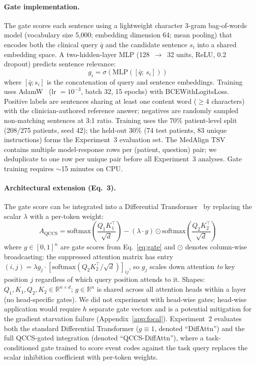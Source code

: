 \documentclass{article}
\begin{document}
\paragraph{Gate implementation.} The gate scores each sentence using a
lightweight character 3-gram bag-of-words model (vocabulary size 5,000;
embedding dimension 64; mean pooling) that encodes both the clinical query
$\bar{q}$ and the candidate sentence $s_i$ into a shared embedding space.
A two-hidden-layer MLP (128~$\to$~32 units, ReLU, 0.2 dropout) predicts
sentence relevance:
\begin{equation}
  g_i = \sigma\!\left(\mathrm{MLP}\!\left([\bar{q};\, s_i]\right)\right)
  \label{eq:gate}
\end{equation}
where $[\bar{q}; s_i]$ is the concatenation of query and sentence embeddings.
Training uses AdamW~\cite{loshchilov2019adamw} (lr $= 10^{-3}$, batch 32,
15 epochs) with BCEWithLogitsLoss. Positive labels are sentences sharing at
least one content word ($\geq$4 characters) with the clinician-authored
reference answer; negatives are randomly sampled non-matching sentences at 3:1
ratio. Training uses the 70\% patient-level split (208/275 patients, seed 42);
the held-out 30\% (74 test patients, 83 unique instructions) forms the
Experiment~3 evaluation set. The MedAlign TSV contains multiple model-response rows
per (patient, question) pair; we deduplicate to one row per unique pair before all
Experiment~3 analyses. Gate training requires $\sim$15 minutes on CPU.

\paragraph{Architectural extension (Eq.~3).} The gate score can be integrated into a
Differential Transformer~\cite{ye2025differential} by replacing the scalar
$\lambda$ with a per-token weight:
\begin{equation}
  A_\mathrm{QCCS} = \mathrm{softmax}\!\left(\frac{Q_1 K_1^\top}{\sqrt{d}}\right)
    - (\lambda \cdot g) \odot \mathrm{softmax}\!\left(\frac{Q_2 K_2^\top}{\sqrt{d}}\right)
  \label{eq:qccs}
\end{equation}
where $g \in [0,1]^n$ are gate scores from Eq.~\ref{eq:gate} and
$\odot$ denotes column-wise broadcasting: the suppressed attention matrix has
entry $(i,j) = \lambda g_j \cdot [\mathrm{softmax}(Q_2K_2^\top/\sqrt{d})]_{ij}$,
so $g_j$ scales down attention \emph{to} key position $j$ regardless of which
query position attends to it. Shapes: $Q_1,K_1,Q_2,K_2 \in \mathbb{R}^{n \times d}$;
$g \in \mathbb{R}^n$ is shared across all attention heads within a layer (no
head-specific gates). We did not experiment with head-wise gates; head-wise
application would require $h$ separate gate vectors and is a potential mitigation
for the gradient starvation failure (Appendix~\ref{app:focal}).
Experiment~2 evaluates both the standard Differential Transformer ($g \equiv 1$,
denoted ``DiffAttn'') and the full QCCS-gated integration (denoted ``QCCS-DiffAttn''),
where a task-conditioned gate trained to score event codes against the task
query replaces the scalar inhibition coefficient with per-token weights.
\end{document}
